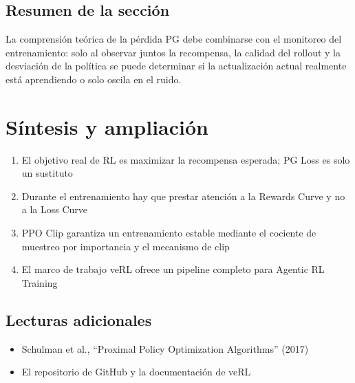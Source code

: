 \documentclass[a4paper]{article}
\begin{document}
\subsection{Resumen de la sección}
La comprensión teórica de la pérdida PG debe combinarse con el monitoreo del entrenamiento: solo al observar juntos la recompensa, la calidad del rollout y la desviación de la política se puede determinar si la actualización actual realmente está aprendiendo o solo oscila en el ruido.

\newpage
\section{Síntesis y ampliación}
\begin{enumerate}
  \item El objetivo real de RL es maximizar la recompensa esperada; PG Loss es solo un sustituto
  \item Durante el entrenamiento hay que prestar atención a la Rewards Curve y no a la Loss Curve
  \item PPO Clip garantiza un entrenamiento estable mediante el cociente de muestreo por importancia y el mecanismo de clip
  \item El marco de trabajo veRL ofrece un pipeline completo para Agentic RL Training
\end{enumerate}

\subsection{Lecturas adicionales}
\begin{itemize}
  \item Schulman et al., ``Proximal Policy Optimization Algorithms'' (2017)
  \item El repositorio de GitHub y la documentación de veRL
\end{itemize}
\end{document}
